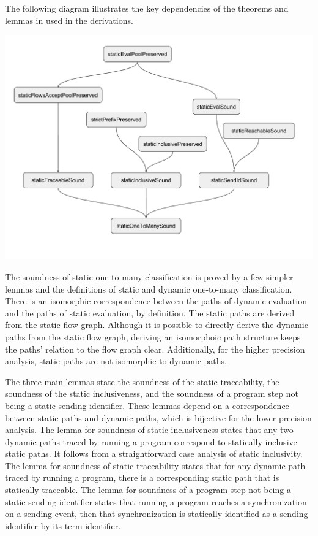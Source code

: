 \documentclass[letterpaper, 11pt]{extarticle}
\begin{document}
The following diagram illustrates the key dependencies of the theorems and lemmas in
used in the derivations.

\includegraphics[width=1\textwidth]{cml-proof-low.pdf}

The soundness of static one-to-many classification is proved by a few simpler lemmas and the
definitions of static and dynamic one-to-many classification.
There is an isomorphic correspondence between the paths of
dynamic evaluation and the paths of static evaluation, by definition.
The static paths are derived from the static flow graph. Although it is possible to directly derive
the dynamic paths from the static flow graph, deriving an isomorphoic path structure keeps the
paths' relation to the flow graph clear. Additionally, for the higher precision analysis, static
paths are not isomorphic to dynamic paths. 

The three main lemmas state the
soundness of the static traceability, the soundness of the static inclusiveness, and
the soundness of a program step not being a static sending identifier. These lemmas depend on a
correspondence between static paths and dynamic paths, which is bijective for the lower
precision analysis. The lemma for soundness of static inclusiveness states that any two
dynamic paths traced by running a program correspond to statically inclusive static paths. It
follows from a straightforward case analysis of static inclusivity. The lemma for soundness of
static traceability states that for any dynamic path traced by running a program, there
is a corresponding static path that is statically traceable. The lemma for soundness of a
program step not being a static sending identifier states that running a program reaches a
synchronization on a sending event, then that synchronization is statically identified as a
sending identifier by its term identifier.
\end{document}
